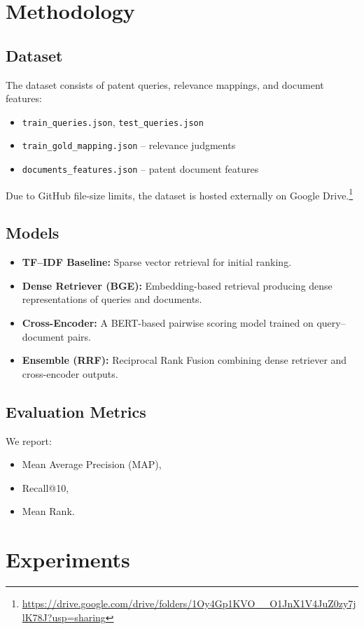 \documentclass[11pt,a4paper]{article}
\begin{document}
\section{Methodology}
\subsection{Dataset}
The dataset consists of patent queries, relevance mappings, and document features:
\begin{itemize}
    \item \texttt{train\_queries.json}, \texttt{test\_queries.json}
    \item \texttt{train\_gold\_mapping.json} – relevance judgments
    \item \texttt{documents\_features.json} – patent document features
\end{itemize}
Due to GitHub file-size limits, the dataset is hosted externally on Google Drive.\footnote{\url{https://drive.google.com/drive/folders/1Oy4Gp1KVO__O1JnX1V4JuZ0zy7jlK78J?usp=sharing}}

\subsection{Models}
\begin{itemize}
    \item \textbf{TF--IDF Baseline:} Sparse vector retrieval for initial ranking.
    \item \textbf{Dense Retriever (BGE):} Embedding-based retrieval producing dense representations of queries and documents.
    \item \textbf{Cross-Encoder:} A BERT-based pairwise scoring model trained on query--document pairs.
    \item \textbf{Ensemble (RRF):} Reciprocal Rank Fusion combining dense retriever and cross-encoder outputs.
\end{itemize}

\subsection{Evaluation Metrics}
We report:
\begin{itemize}
    \item Mean Average Precision (MAP),
    \item Recall@10,
    \item Mean Rank.
\end{itemize}

\section{Experiments}
\end{document}
